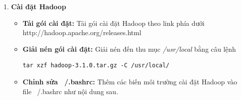 \begin{enumerate}
\begin{itemize}
			\end{itemize}
			\item \textbf{Cài đặt Hadoop}
			\begin{itemize}
				\item \textbf{Tải gói cài đặt: }Tải gói cài đặt Hadoop theo link phía dưới\\
				http://hadoop.apache.org/releases.html
				\item \textbf{Giải nén gói cài đặt: }Giải nén đến thu mục \textit{/usr/local} bằng câu lệnh
				\begin{lstlisting}
tar xzf hadoop-3.1.0.tar.gz -C /usr/local/
				\end{lstlisting}
				\item \textbf{Chỉnh sửa ~/.bashrc: }Thêm các biến môi trường cài đặt Hadoop vào file ~/.bashrc như nội dung sau.
		

\end{itemize}
\end{enumerate}
